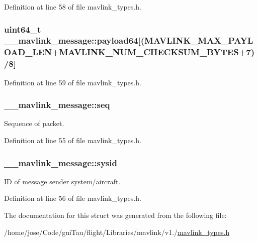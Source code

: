 Definition at line 58 of file mavlink\-\_\-types.\-h.

\hypertarget{struct____mavlink__message_a267401209e74271b7ded879bb0f44e73}{
\subsubsection[{payload64}]{\setlength{\rightskip}{0pt plus 5cm}uint64\-\_\-t \-\_\-\-\_\-mavlink\-\_\-message\-::payload64\mbox{[}(M\-A\-V\-L\-I\-N\-K\-\_\-\-M\-A\-X\-\_\-\-P\-A\-Y\-L\-O\-A\-D\-\_\-\-L\-E\-N+M\-A\-V\-L\-I\-N\-K\-\_\-\-N\-U\-M\-\_\-\-C\-H\-E\-C\-K\-S\-U\-M\-\_\-\-B\-Y\-T\-E\-S+7)/8\mbox{]}}}\label{struct____mavlink__message_a267401209e74271b7ded879bb0f44e73}


Definition at line 59 of file mavlink\-\_\-types.\-h.

\hypertarget{struct____mavlink__message_aae05bedaab3c62acaccb416478490eff}{
\subsubsection[{seq}]{ \-\_\-\-\_\-mavlink\-\_\-message\-::seq}}\label{struct____mavlink__message_aae05bedaab3c62acaccb416478490eff}


Sequence of packet. 



Definition at line 55 of file mavlink\-\_\-types.\-h.

\hypertarget{struct____mavlink__message_ad4bfd4108688429b30940a35b44d4dd3}{
\subsubsection[{sysid}]{ \-\_\-\-\_\-mavlink\-\_\-message\-::sysid}}\label{struct____mavlink__message_ad4bfd4108688429b30940a35b44d4dd3}


I\-D of message sender system/aircraft. 



Definition at line 56 of file mavlink\-\_\-types.\-h.



The documentation for this struct was generated from the following file\-:\begin{DoxyCompactItemize}
\item 
/home/jose/\-Code/gui\-Tau/flight/\-Libraries/mavlink/v1./\hyperlink{mavlink__types_8h}{mavlink\-\_\-types.\-h}\end{DoxyCompactItemize}
